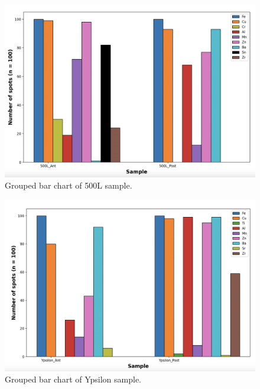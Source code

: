 \begin{figure}[H]
\centering
    \includegraphics[scale=0.27]{images/500L_HM.png}
    \caption{Grouped bar chart of 500L sample.}
    \label{fig:500L_HM}
\end{figure} 

\begin{figure}[H]
\centering
    \includegraphics[scale=0.27]{images/Ypsilon_HM.png}
    \caption{Grouped bar chart of Ypsilon sample.}
    \label{fig:Ypsilon_HM}
\end{figure} 

